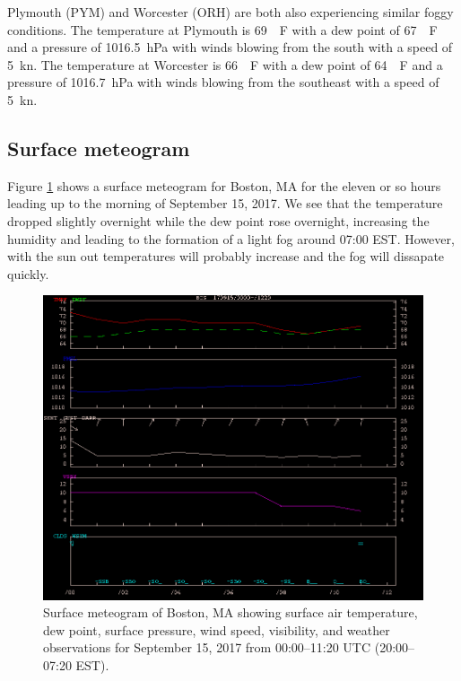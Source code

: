 \documentclass[11pt]{article}
\begin{document}
Plymouth (PYM) and Worcester (ORH) are both also experiencing similar foggy conditions. The temperature at Plymouth is \SI{69}{\SIUnitSymbolDegree\F} with a dew point of \SI{67}{\SIUnitSymbolDegree\F} and a pressure of \SI{1016.5}{\hecto\Pa} with winds blowing from the south with a speed of \SI{5}{\knot}. The temperature at Worcester is \SI{66}{\SIUnitSymbolDegree\F} with a dew point of \SI{64}{\SIUnitSymbolDegree\F} and a pressure of \SI{1016.7}{\hecto\Pa} with winds blowing from the southeast with a speed of \SI{5}{\knot}.

\subsection*{Surface meteogram}
Figure \ref{fig:meteogram} shows a surface meteogram for Boston, MA for the eleven or so hours leading up to the morning of September 15, 2017. We see that the temperature dropped slightly overnight while the dew point rose overnight, increasing the humidity and leading to the formation of a light fog around 07:00 EST. However, with the sun out temperatures will probably increase and the fog will dissapate quickly.

\begin{figure}
  \centering
  \includegraphics[width=\textwidth]{meteogramBOS.png}
  \caption{Surface meteogram of Boston, MA showing surface air temperature, dew point, surface pressure, wind speed, visibility, and weather observations for September 15, 2017 from 00:00--11:20 UTC (20:00--07:20 EST).}
  \label{fig:meteogram}
\end{figure}
\end{document}
